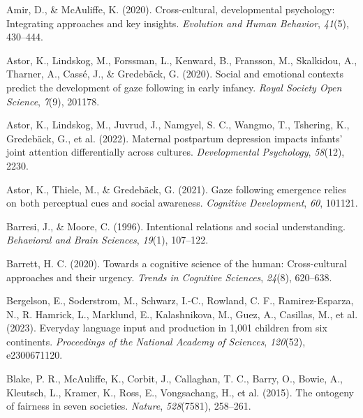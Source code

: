 \documentclass[
  man,floatsintext]{apa7}
\newlength{\cslhangindent}
\newlength{\cslentryspacingunit} %
\newenvironment{CSLReferences}[2] %
 {%
  \setlength{\parindent}{0pt}
  \ifodd #1
  \let\oldpar\par
  \def\par{\hangindent=\cslhangindent\oldpar}
  \fi
  \setlength{\parskip}{#2\cslentryspacingunit}
 }%
 {}
\begin{document}
\hypertarget{refs}{}
\begin{CSLReferences}{1}{0}
\leavevmode{}%
Amir, D., \& McAuliffe, K. (2020). Cross-cultural, developmental psychology: Integrating approaches and key insights. \emph{Evolution and Human Behavior}, \emph{41}(5), 430--444.

\leavevmode{}%
Astor, K., Lindskog, M., Forssman, L., Kenward, B., Fransson, M., Skalkidou, A., Tharner, A., Cassé, J., \& Gredebäck, G. (2020). Social and emotional contexts predict the development of gaze following in early infancy. \emph{Royal Society Open Science}, \emph{7}(9), 201178.

\leavevmode{}%
Astor, K., Lindskog, M., Juvrud, J., Namgyel, S. C., Wangmo, T., Tshering, K., Gredebäck, G., et al. (2022). Maternal postpartum depression impacts infants' joint attention differentially across cultures. \emph{Developmental Psychology}, \emph{58}(12), 2230.

\leavevmode{}%
Astor, K., Thiele, M., \& Gredebäck, G. (2021). Gaze following emergence relies on both perceptual cues and social awareness. \emph{Cognitive Development}, \emph{60}, 101121.

\leavevmode{}%
Barresi, J., \& Moore, C. (1996). Intentional relations and social understanding. \emph{Behavioral and Brain Sciences}, \emph{19}(1), 107--122.

\leavevmode{}%
Barrett, H. C. (2020). Towards a cognitive science of the human: Cross-cultural approaches and their urgency. \emph{Trends in Cognitive Sciences}, \emph{24}(8), 620--638.

\leavevmode{}%
Bergelson, E., Soderstrom, M., Schwarz, I.-C., Rowland, C. F., Ramirez-Esparza, N., R. Hamrick, L., Marklund, E., Kalashnikova, M., Guez, A., Casillas, M., et al. (2023). Everyday language input and production in 1,001 children from six continents. \emph{Proceedings of the National Academy of Sciences}, \emph{120}(52), e2300671120.

\leavevmode{}%
Blake, P. R., McAuliffe, K., Corbit, J., Callaghan, T. C., Barry, O., Bowie, A., Kleutsch, L., Kramer, K., Ross, E., Vongsachang, H., et al. (2015). The ontogeny of fairness in seven societies. \emph{Nature}, \emph{528}(7581), 258--261.


\end{CSLReferences}
\end{document}
